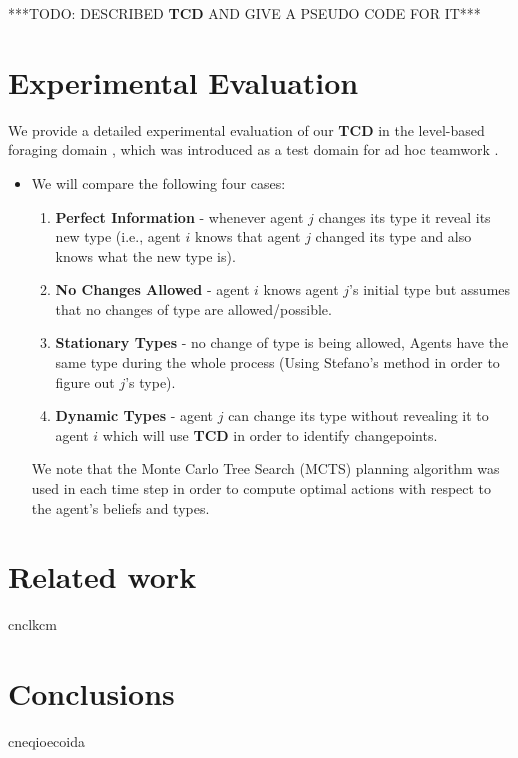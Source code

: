 \documentclass{article}
\begin{document}
***TODO: DESCRIBED \textbf{TCD} AND GIVE A PSEUDO CODE FOR IT***


 

\section{Experimental Evaluation}
We provide a detailed experimental evaluation of our \textbf{TCD} in the level-based foraging domain \cite{albrecht2013game}, which was introduced as a test domain for ad hoc teamwork \cite{stone2010ad}. 



\begin{itemize}
	\item We will compare the following four cases: 	\begin{enumerate}
		\item \textbf{Perfect Information} - whenever agent $j$ changes its type it reveal its new type (i.e., agent $i$ knows that agent $j$ changed its type and also knows what the new type is).
		\item \textbf{No Changes Allowed} - agent $i$ knows agent $j$'s initial type but assumes that no changes of type are allowed/possible.
		\item \textbf{Stationary Types} - no change of type is being allowed, Agents have the same type during the whole process (Using Stefano's method in order to figure out $j$'s type).
		\item \textbf{Dynamic Types} - agent $j$ can change its type without revealing it to agent $i$ which will use \textbf{TCD} in order to identify changepoints.
	\end{enumerate}
	We note that the Monte Carlo Tree Search (MCTS) planning algorithm was used in each time step in order to compute optimal actions with respect to the agent's beliefs and types.
\end{itemize}

\section{Related work}
cnclkcm
\section{Conclusions}
cneqioecoida





%
  
\end{document}
